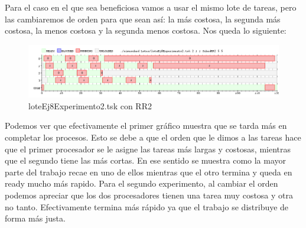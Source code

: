 Para el caso en el que sea beneficiosa vamos a usar el mismo lote de tareas, pero las cambiaremos de orden para que sean así: 
la más costosa, la segunda más costosa, la menos costosa y la segunda menos costosa. Nos queda lo siguiente:

\begin{figure}[H]
  \centering
    \includegraphics[width=1.1\textwidth]{imagenes/Ej8Experimento2.png}
  \caption{loteEj8Experimento2.tsk con RR2}
\end{figure}

Podemos ver que efectivamente el primer gráfico muestra que se tarda más en completar los procesos. Esto se debe a que el orden que le dimos a las tareas hace que el primer
procesador se le asigne las tareas más largas y costosas, mientras que el segundo tiene las más cortas. En ese sentido se muestra como la mayor parte del trabajo recae en uno de ellos
mientras que el otro termina y queda en ready mucho más rapido. Para el segundo experimento, al cambiar el orden podemos apreciar que los dos procesadores tienen una tarea
muy costosa y otra no tanto. Efectivamente termina más rápido ya que el trabajo se distribuye de forma más justa.